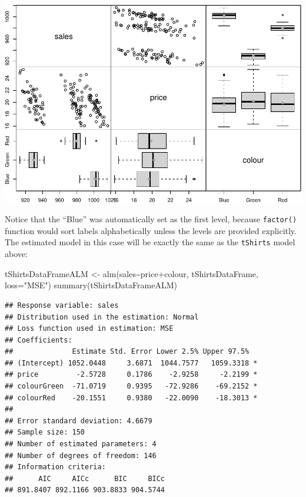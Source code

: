 \documentclass[
]{book}
\newenvironment{Shaded}{\begin{snugshade}}{\end{snugshade}}
\newcommand{\AttributeTok}[1]{\textcolor[rgb]{0.77,0.63,0.00}{#1}}
\newcommand{\FunctionTok}[1]{\textcolor[rgb]{0.00,0.00,0.00}{#1}}
\newcommand{\NormalTok}[1]{#1}
\newcommand{\OtherTok}[1]{\textcolor[rgb]{0.56,0.35,0.01}{#1}}
\newcommand{\SpecialCharTok}[1]{\textcolor[rgb]{0.00,0.00,0.00}{#1}}
\newcommand{\StringTok}[1]{\textcolor[rgb]{0.31,0.60,0.02}{#1}}
\theoremstyle{definition}
\theoremstyle{definition}
\theoremstyle{definition}
\theoremstyle{definition}
\theoremstyle{remark}
\begin{document}
\includegraphics{Svetunkov---Statistics-for-Business-Analytics_files/figure-latex/unnamed-chunk-80-1.pdf}

Notice that the ``Blue'' was automatically set as the first level, because \texttt{factor()} function would sort labels alphabetically unless the levels are provided explicitly. The estimated model in this case will be exactly the same as the \texttt{tShirts} model above:

\begin{Shaded}
\begin{Highlighting}[]
\NormalTok{tShirtsDataFrameALM }\OtherTok{\textless{}{-}} \FunctionTok{alm}\NormalTok{(sales}\SpecialCharTok{\textasciitilde{}}\NormalTok{price}\SpecialCharTok{+}\NormalTok{colour, tShirtsDataFrame, }\AttributeTok{loss=}\StringTok{"MSE"}\NormalTok{)}
\FunctionTok{summary}\NormalTok{(tShirtsDataFrameALM)}
\end{Highlighting}
\end{Shaded}

\begin{verbatim}
## Response variable: sales
## Distribution used in the estimation: Normal
## Loss function used in estimation: MSE
## Coefficients:
##              Estimate Std. Error Lower 2.5% Upper 97.5%  
## (Intercept) 1052.0448     3.6871  1044.7577   1059.3318 *
## price         -2.5728     0.1786    -2.9258     -2.2199 *
## colourGreen  -71.0719     0.9395   -72.9286    -69.2152 *
## colourRed    -20.1551     0.9380   -22.0090    -18.3013 *
## 
## Error standard deviation: 4.6679
## Sample size: 150
## Number of estimated parameters: 4
## Number of degrees of freedom: 146
## Information criteria:
##      AIC     AICc      BIC     BICc 
## 891.8407 892.1166 903.8833 904.5744
\end{verbatim}
\end{document}
